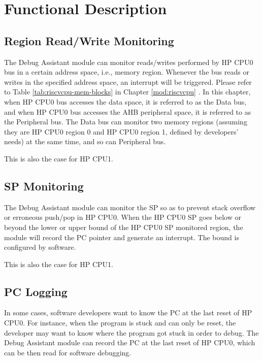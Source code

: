 \documentclass[main\_\_EN.tex]{subfiles}
\begin{document}
\section{Functional Description}
\label{sec:dbgassist-func-descr}

\subsection{Region Read/Write Monitoring}

The Debug Assistant module can monitor reads/writes performed by HP CPU0 bus in a certain address space, i.e., memory region. Whenever the bus reads or writes in the specified address space, an interrupt will be triggered. Please refer to Table \ref{tab:riscvcpu-mem-blocks} in Chapter \ref{mod:riscvcpu} \textit{}. In this chapter, when HP CPU0 bus accesses the data space, it is referred to as the Data bus, and when HP CPU0 bus accesses the AHB peripheral space, it is referred to as the Peripheral bus. The Data bus can monitor two memory regions (assuming they are HP CPU0 region 0 and HP CPU0 region 1, defined by developers' needs) at the same time, and so can Peripheral bus.

This is also the case for HP CPU1.

\subsection{SP Monitoring}

The Debug Assistant module can monitor the SP so as to prevent stack overflow or erroneous push/pop in HP CPU0. When the HP CPU0 SP goes below or beyond the lower or upper bound of the HP CPU0 SP monitored region, the module will record the PC pointer and generate an interrupt. The bound is configured by software.

This is also the case for HP CPU1.

\subsection{PC Logging}

In some cases, software developers want to know the PC at the last reset of HP CPU0. For instance, when the program is stuck and can only be reset, the developer may want to know where the program got stuck in order to debug. The Debug Assistant module can record the PC at the last reset of HP CPU0, which can be then read for software debugging.
\end{document}
